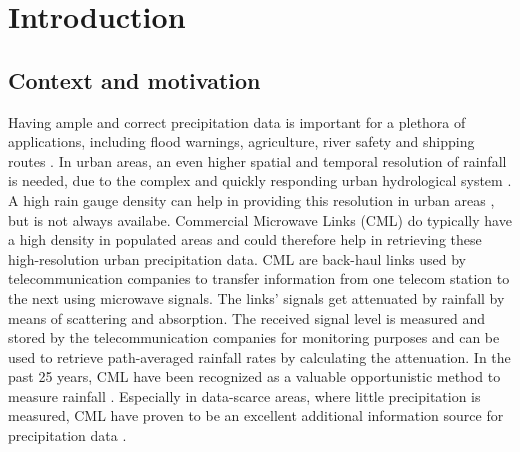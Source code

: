 \documentclass[twocolumn, 10pt, a4paper]{memoir}
\begin{document}
\cleardoublepage

  

\cleardoublepage 

\pagestyle{ruled}
\mainmatter          

\chapter{Introduction}\vspace{-6mm} 
\section{Context and motivation}

Having ample and correct precipitation data is important for a plethora of applications, including flood warnings, agriculture, river safety and shipping routes . In urban areas, an even higher spatial and temporal resolution of rainfall is needed, due to the complex and quickly responding urban hydrological system . A high rain gauge density can help in providing this resolution in urban areas , but is not always availabe. Commercial Microwave Links (CML) do typically have a high density in populated areas and could therefore help in retrieving these high-resolution urban precipitation data. CML are back-haul links used by telecommunication companies to transfer information from one telecom station to the next using microwave signals. The links' signals get attenuated by rainfall by means of scattering and absorption. The received signal level is measured and stored by the telecommunication companies for monitoring purposes and can be used to retrieve path-averaged rainfall rates by calculating the attenuation. In the past 25 years, CML have been recognized as a valuable opportunistic method to measure rainfall . Especially in data-scarce areas, where little precipitation is measured, CML have proven to be an excellent additional information source for precipitation data .   
\end{document}
